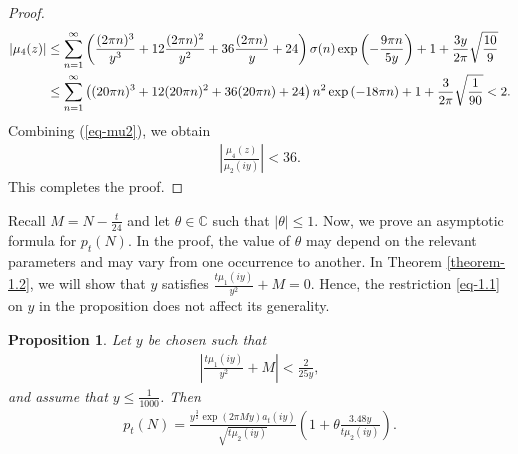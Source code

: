 \documentclass[11pt]{amsart}
\theoremstyle{plain}
\newtheorem{proposition}[theorem]{Proposition}
\numberwithin{equation}{section}
\begin{document}
\begin{proof}
		\begin{align*}%
			\notag
			|\mu_{4}(z)|
			&\le\sum_{n=1}^{\infty}\left(\frac{(2\pi n)^{3}}{y^{3}}+12\frac{(2\pi n)^{2}}{y^{2}}+36\frac{(2\pi n)}{y}+24\right)\sigma(n)\exp\left(-\frac{9\pi n}{5y}\right)+1+\frac{3y}{2\pi}\sqrt{\frac{10}{9}}\\
			&\le\sum_{n=1}^{\infty}\left((20\pi n)^{3}+12(20\pi n)^{2}+36(20\pi n)+24\right)n^{2}\exp\left(-18\pi n\right)+1+\frac{3}{2\pi}\sqrt{\frac{1}{90}}<2.
		\end{align*}
		Combining (\ref{eq-mu2}), we obtain
		\begin{align*}
			\left|\frac{\mu_{4}(z)}{\mu_2(iy)}\right|<36.     
		\end{align*}
		This completes the proof.
	\end{proof}
	Recall $M=N-\frac{t}{24}$ and let $\theta \in \mathbb{C}$ such that $|\theta|\le 1$. Now, we prove an asymptotic formula for $p_t(N)$. In the proof, the value of $\theta$ may depend on the relevant parameters and may vary from one occurrence to another. In Theorem \ref{theorem-1.2}, we will show that $y$ satisfies $\frac{t\mu_{1}(iy)}{y^{2}}+M=0$. Hence, the restriction \eqref{eq-1.1} on $y$ in the proposition does not affect its generality.
	\begin{proposition}\label{theorem-main} Let $y$ be chosen such that 
		\begin{align}\label{eq-assum}
			\left|\frac{t\mu_{1}(iy)}{y^{2}}+M\right|<\frac{2}{25y},
		\end{align} and assume that $y\le \frac{1}{1000}$. Then
		\begin{align*}
			p_t(N)=\frac{y^{\frac{3}{2}}\exp(2\pi My)a_{t}(iy)}{\sqrt{t\mu_{2}(iy)}}\left(1+\theta\frac{3.48y}{t\mu_2(iy)}\right).    
		\end{align*}
	\end{proposition}
\end{document}
